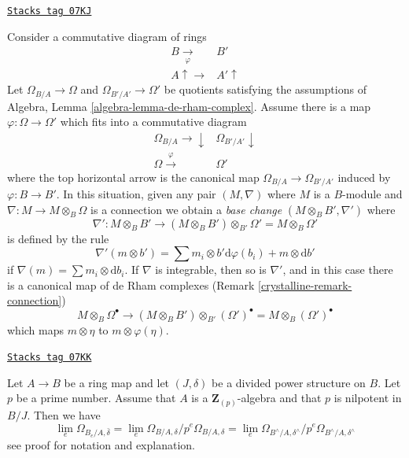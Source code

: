 \begin{remark}
\label{crystalline-remark-base-change-connection}
\href{https://stacks.math.columbia.edu/tag/07KJ}{\texttt{Stacks tag 07KJ}}

Consider a commutative diagram of rings
$$
\begin{array}{cc}B \underset{\varphi}{\longrightarrow} & B' \\ A \uparrow\longrightarrow & A' \uparrow\end{array}
$$
Let $\Omega_{B/A} \to \Omega$ and $\Omega_{B'/A'} \to \Omega'$
be quotients satisfying the assumptions of
Algebra, Lemma \ref{algebra-lemma-de-rham-complex}.
Assume there is a map $\varphi : \Omega \to \Omega'$ which
fits into a commutative diagram
$$
\begin{array}{cc}\Omega_{B/A} \longrightarrow\downarrow & \Omega_{B'/A'} \downarrow \\ \Omega \overset{\varphi}{\longrightarrow} & \Omega'\end{array}
$$
where the top horizontal arrow is the canonical map
$\Omega_{B/A} \to \Omega_{B'/A'}$ induced by $\varphi : B \to B'$.
In this situation, given any pair $(M, \nabla)$ where $M$ is a $B$-module
and $\nabla : M \to M \otimes_B \Omega$ is a connection
we obtain a {\it base change} $(M \otimes_B B', \nabla')$ where
$$
\nabla' :
M \otimes_B B'
\longrightarrow
(M \otimes_B B') \otimes_{B'} \Omega' = M \otimes_B \Omega'
$$
is defined by the rule
$$
\nabla'(m \otimes b') =
\sum m_i \otimes b'\text{d}\varphi(b_i) + m \otimes \text{d}b'
$$
if $\nabla(m) = \sum m_i \otimes \text{d}b_i$. If $\nabla$ is integrable,
then so is $\nabla'$, and in this case there is a canonical map of
de Rham complexes (Remark \ref{crystalline-remark-connection})
\begin{equation}
\label{equation-base-change-map-complexes}
M \otimes_B \Omega^\bullet
\longrightarrow
(M \otimes_B B') \otimes_{B'} (\Omega')^\bullet =
M \otimes_B (\Omega')^\bullet
\end{equation}
which maps $m \otimes \eta$ to $m \otimes \varphi(\eta)$.
\end{remark}

\begin{lemma}
\label{crystalline-lemma-differentials-completion}
\href{https://stacks.math.columbia.edu/tag/07KK}{\texttt{Stacks tag 07KK}}

Let $A \to B$ be a ring map and let $(J, \delta)$ be a divided power
structure on $B$. Let $p$ be a prime number. Assume that $A$ is a
$\mathbf{Z}_{(p)}$-algebra and that $p$ is nilpotent in $B/J$. Then
we have
$$
\lim_e \Omega_{B_e/A, \bar\delta} =
\lim_e \Omega_{B/A, \delta}/p^e\Omega_{B/A, \delta} =
\lim_e \Omega_{B^\wedge/A, \delta^\wedge}/p^e \Omega_{B^\wedge/A, \delta^\wedge}
$$
see proof for notation and explanation.
\end{lemma}

